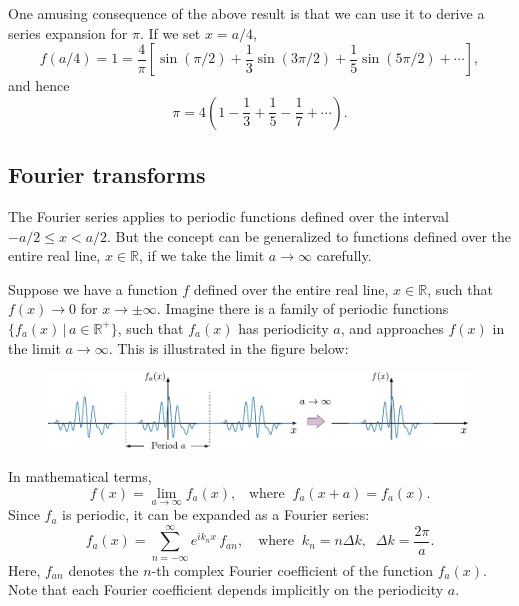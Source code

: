 \documentclass[10pt,a4paper]{article}
\begin{document}
One amusing consequence of the above result is that we can use it to
derive a series expansion for $\pi$. If we set $x = a/4$,
\begin{equation}
f(a/4) = 1 = \frac{4}{\pi} \left[\sin(\pi/2) + \frac{1}{3}\sin(3\pi/2) + \frac{1}{5}\sin(5\pi/2) + \cdots\right],
\end{equation}
and hence
\begin{equation}
\pi = 4 \left(1 - \frac{1}{3} + \frac{1}{5} - \frac{1}{7} + \cdots\right).
\end{equation}

\subsection{Fourier transforms}\label{fourier-transforms}

The Fourier series applies to periodic functions defined over the
interval $-a/2 \le x < a/2$. But the concept can be generalized to
functions defined over the entire real line, $x \in \mathbb{R}$, if we
take the limit $a \rightarrow \infty$ carefully.

Suppose we have a function $f$ defined over the entire real line,
$x \in \mathbb{R}$, such that $f(x) \rightarrow 0$ for
$x \rightarrow \pm\infty$. Imagine there is a family of periodic
functions $\big\{f_a(x) \,\big|\, a \in\mathbb{R}^+\big\}$, such that
$f_a(x)$ has periodicity $a$, and approaches $f(x)$ in the limit
$a\rightarrow \infty$. This is illustrated in the figure below:

\begin{figure}[ht]
  \includegraphics[width=0.99\textwidth]{periodicity_ft}
\end{figure}

\noindent
In mathematical terms,
\begin{equation}
  f(x) = \lim_{a \rightarrow \infty} f_a(x), \;\;\;\text{where}\;\;
  f_a(x+a) = f_a(x).
\end{equation}
Since $f_a$ is periodic, it can be expanded as a Fourier series:
\begin{equation}
f_a(x) = \sum_{n=-\infty}^\infty e^{i k_n x}\, f_{an}, \quad\mathrm{where}\;\; k_n = n\Delta k, \;\; \Delta k = \frac{2\pi}{a}.
\end{equation}
Here, $f_{an}$ denotes the $n$-th complex Fourier coefficient of the
function $f_a(x)$. Note that each Fourier coefficient depends
implicitly on the periodicity $a$.
\end{document}
